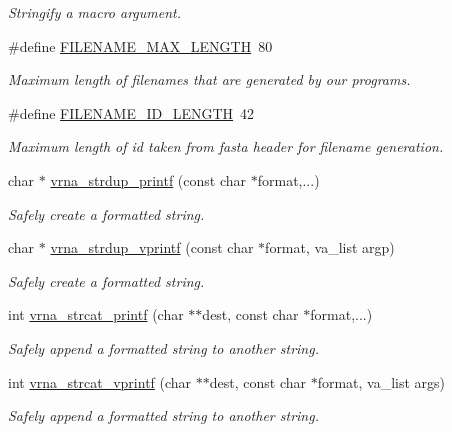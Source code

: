 \begin{DoxyCompactItemize}
\begin{DoxyCompactList}\small\item\em Stringify a macro argument. \end{DoxyCompactList}\item 
\#define \hyperlink{group__string__utils_gafb228174279df9486a5cb56ac0bc79a3}{F\+I\+L\+E\+N\+A\+M\+E\+\_\+\+M\+A\+X\+\_\+\+L\+E\+N\+G\+TH}~80
\begin{DoxyCompactList}\small\item\em Maximum length of filenames that are generated by our programs. \end{DoxyCompactList}\item 
\#define \hyperlink{group__string__utils_ga33c3b1826b8e2739f09f111ec719ded5}{F\+I\+L\+E\+N\+A\+M\+E\+\_\+\+I\+D\+\_\+\+L\+E\+N\+G\+TH}~42
\begin{DoxyCompactList}\small\item\em Maximum length of id taken from fasta header for filename generation. \end{DoxyCompactList}\item 
char $\ast$ \hyperlink{group__string__utils_ga33cc0190a326ec368277caa777b8bf18}{vrna\+\_\+strdup\+\_\+printf} (const char $\ast$format,...)
\begin{DoxyCompactList}\small\item\em Safely create a formatted string. \end{DoxyCompactList}\item 
char $\ast$ \hyperlink{group__string__utils_ga459fdee190ed81bb7773cbaf671748a9}{vrna\+\_\+strdup\+\_\+vprintf} (const char $\ast$format, va\+\_\+list argp)
\begin{DoxyCompactList}\small\item\em Safely create a formatted string. \end{DoxyCompactList}\item 
int \hyperlink{group__string__utils_gac0771ec71316023067f2aae61a5aa0fb}{vrna\+\_\+strcat\+\_\+printf} (char $\ast$$\ast$dest, const char $\ast$format,...)
\begin{DoxyCompactList}\small\item\em Safely append a formatted string to another string. \end{DoxyCompactList}\item 
int \hyperlink{group__string__utils_ga122df216996ba62fd5056b7743e3131a}{vrna\+\_\+strcat\+\_\+vprintf} (char $\ast$$\ast$dest, const char $\ast$format, va\+\_\+list args)
\begin{DoxyCompactList}\small\item\em Safely append a formatted string to another string. \end{DoxyCompactList}\item 

\end{DoxyCompactItemize}
